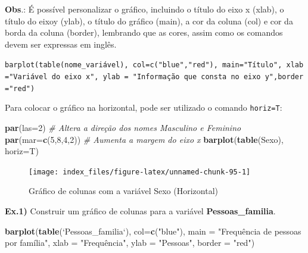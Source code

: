 \documentclass[12pt,brazil,oneside]{book}
\newenvironment{Shaded}{\begin{snugshade}}{\end{snugshade}}
\newcommand{\CommentTok}[1]{\textcolor[rgb]{0.56,0.35,0.01}{\textit{#1}}}
\newcommand{\DataTypeTok}[1]{\textcolor[rgb]{0.13,0.29,0.53}{#1}}
\newcommand{\DecValTok}[1]{\textcolor[rgb]{0.00,0.00,0.81}{#1}}
\newcommand{\KeywordTok}[1]{\textcolor[rgb]{0.13,0.29,0.53}{\textbf{#1}}}
\newcommand{\NormalTok}[1]{#1}
\newcommand{\StringTok}[1]{\textcolor[rgb]{0.31,0.60,0.02}{#1}}
\begin{document}
\textbf{Obs}.: É possível personalizar o gráfico, incluindo o título do eixo x (xlab), o título do eixoy (ylab), o título do gráfico (main), a cor da coluna (col) e cor da borda da coluna (border), lembrando que as cores, assim como os comandos devem ser expressas em inglês.

\texttt{barplot(table(nome\_variável),\ col=c("blue","red"),\ main="Título",\ xlab="Variável\ do\ eixo\ x",\ ylab\ =\ "Informação\ que\ consta\ no\ eixo\ y",border="red")}

Para colocar o gráfico na horizontal, pode ser utilizado o comando \texttt{horiz=T}:

\begin{Shaded}
\begin{Highlighting}[]
\KeywordTok{par}\NormalTok{(}\DataTypeTok{las=}\DecValTok{2}\NormalTok{) }\CommentTok{# Altera a direção dos nomes Masculino e Feminino}
\KeywordTok{par}\NormalTok{(}\DataTypeTok{mar=}\KeywordTok{c}\NormalTok{(}\DecValTok{5}\NormalTok{,}\DecValTok{8}\NormalTok{,}\DecValTok{4}\NormalTok{,}\DecValTok{2}\NormalTok{)) }\CommentTok{# Aumenta a margem do eixo x}
\KeywordTok{barplot}\NormalTok{(}\KeywordTok{table}\NormalTok{(Sexo), }\DataTypeTok{horiz=}\NormalTok{T)}
\end{Highlighting}
\end{Shaded}

\begin{figure}[H]

{\centering \texttt{[image: index\_files/figure-latex/unnamed-chunk-95-1]} 

}

\caption{Gráfico de colunas com a variável Sexo (Horizontal)}\label{fig:unnamed-chunk-95}
\end{figure}

\textbf{Ex.1)} Construir um gráfico de colunas para a variável \textbf{Pessoas\_familia}.

\begin{Shaded}
\begin{Highlighting}[]
\KeywordTok{barplot}\NormalTok{(}\KeywordTok{table}\NormalTok{(}\StringTok{`}\DataTypeTok{Pessoas_familia}\StringTok{`}\NormalTok{), }\DataTypeTok{col=}\KeywordTok{c}\NormalTok{(}\StringTok{"blue"}\NormalTok{), }
        \DataTypeTok{main =} \StringTok{"Frequência de pessoas por família"}\NormalTok{, }
        \DataTypeTok{xlab =} \StringTok{"Frequência", }
\StringTok{        ylab = "}\NormalTok{Pessoas}\StringTok{", }
\StringTok{        border = "}\NormalTok{red}\StringTok{")}
\end{Highlighting}
\end{Shaded}
\end{document}
